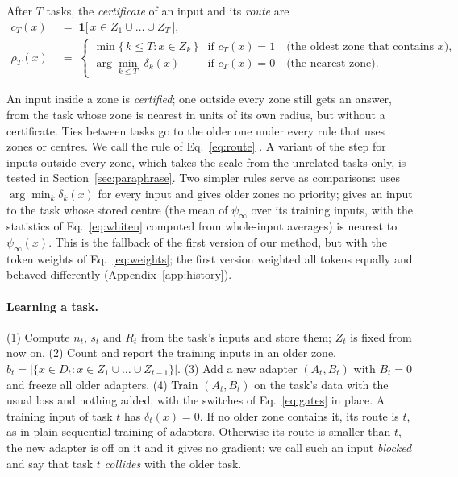 \begin{definition}
After $T$ tasks, the \emph{certificate} of an input and its \emph{route} are
\begin{align}
  c_T(x) &\;=\; \mathbf{1}\bigl[\, x \in Z_1 \cup \dots \cup Z_T \,\bigr] , \label{eq:certificate}\\[2pt]
  \rho_T(x) &\;=\;
  \begin{cases}
    \min \{\, k \le T : x \in Z_k \,\} & \text{if } c_T(x) = 1 \quad \text{(the oldest zone that contains } x \text{)}, \\[2pt]
    \arg\min_{k \le T}\; \delta_k(x) & \text{if } c_T(x) = 0 \quad \text{(the nearest zone)} .
  \end{cases}
  \label{eq:route}
\end{align}
\end{definition}

An input inside a zone is \emph{certified}; one outside every zone still gets an answer, from the
task whose zone is nearest in units of its own radius, but without a certificate. Ties between
tasks go to the older one under every rule that uses zones or centres. We call the rule of
Eq.~\eqref{eq:route} \cert{}. A variant of the step for inputs outside every zone, which takes
the scale from the unrelated tasks only, is tested in Section~\ref{sec:paraphrase}. Two simpler
rules serve as comparisons: \nearest{} uses $\arg\min_k \delta_k(x)$ for every input and gives
older zones no priority; \centre{} gives an input to the task whose stored centre (the mean of
$\psi_\infty$ over its training inputs, with the statistics of Eq.~\eqref{eq:whiten} computed from
whole-input averages) is nearest to $\psi_\infty(x)$. This is the fallback of the first version of
our method, but with the token weights of Eq.~\eqref{eq:weights}; the first version weighted all
tokens equally and behaved differently (Appendix~\ref{app:history}).

\paragraph{Learning a task.} (1) Compute $n_t$, $s_t$ and $R_t$ from the task's inputs and store
them; $Z_t$ is fixed from now on. (2) Count and report the training inputs in an older zone,
$b_t = |\{x \in D_t : x \in Z_1 \cup \dots \cup Z_{t-1}\}|$. (3) Add a new adapter $(A_t, B_t)$ with
$B_t = 0$ and freeze all older adapters. (4) Train $(A_t, B_t)$ on the task's data with the usual
loss and nothing added, with the switches of Eq.~\eqref{eq:gates} in place. A training input of
task $t$ has $\delta_t(x) = 0$. If no older zone contains it, its route is $t$, as in plain
sequential training of adapters. Otherwise its route is smaller than $t$, the new adapter is off
on it and it gives no gradient; we call such an input \emph{blocked} and say that task $t$
\emph{collides} with the older task.

